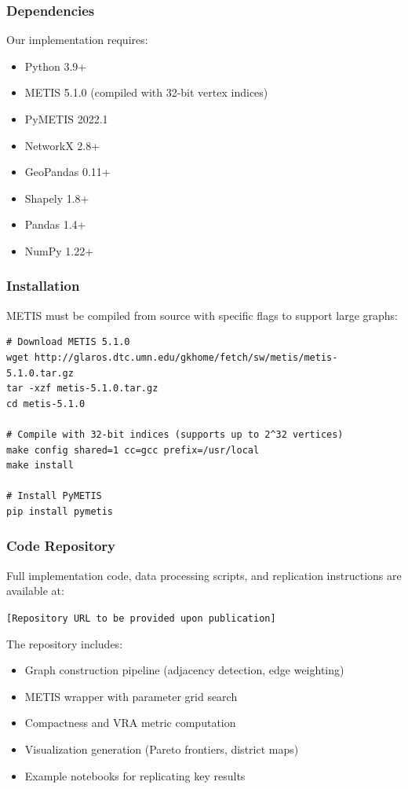 \subsubsection{Dependencies}

Our implementation requires:
\begin{itemize}
    \item Python 3.9+
    \item METIS 5.1.0 (compiled with 32-bit vertex indices)
    \item PyMETIS 2022.1
    \item NetworkX 2.8+
    \item GeoPandas 0.11+
    \item Shapely 1.8+
    \item Pandas 1.4+
    \item NumPy 1.22+
\end{itemize}

\subsubsection{Installation}

METIS must be compiled from source with specific flags to support large graphs:

\begin{verbatim}
# Download METIS 5.1.0
wget http://glaros.dtc.umn.edu/gkhome/fetch/sw/metis/metis-5.1.0.tar.gz
tar -xzf metis-5.1.0.tar.gz
cd metis-5.1.0

# Compile with 32-bit indices (supports up to 2^32 vertices)
make config shared=1 cc=gcc prefix=/usr/local
make install

# Install PyMETIS
pip install pymetis
\end{verbatim}

\subsubsection{Code Repository}

Full implementation code, data processing scripts, and replication instructions are available at:

\begin{center}
\texttt{[Repository URL to be provided upon publication]}
\end{center}

The repository includes:
\begin{itemize}
    \item Graph construction pipeline (adjacency detection, edge weighting)
    \item METIS wrapper with parameter grid search
    \item Compactness and VRA metric computation
    \item Visualization generation (Pareto frontiers, district maps)
    \item Example notebooks for replicating key results
\end{itemize}

